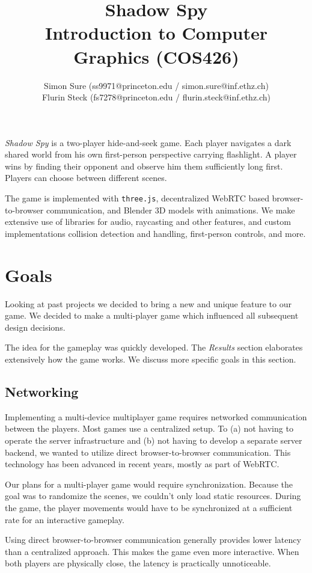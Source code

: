 \documentclass[11pt]{article}
\title{Shadow Spy\\Introduction to Computer Graphics (COS426)}
\author{Simon Sure (ss9971@princeton.edu / simon.sure@inf.ethz.ch)\\
        Flurin Steck (fs7278@princeton.edu / flurin.steck@inf.ethz.ch)}
\begin{document}
\maketitle
\textit{Shadow Spy} is a two-player hide-and-seek game. Each player navigates a dark shared world from his own first-person perspective carrying flashlight. A player wins by finding their opponent and observe him them sufficiently long first. Players can choose between different scenes.
\par The game is implemented with \texttt{three.js}, decentralized WebRTC based browser-to-browser communication, and Blender 3D models with animations. We make extensive use of libraries for audio, raycasting and other features, and custom implementations collision detection and handling, first-person controls, and more.

\tableofcontents





\section{Goals}
\par Looking at past projects we decided to bring a new and unique feature to our game. We decided to make a multi-player game which influenced all subsequent design decisions.
\par The idea for the gameplay was quickly developed. The \textit{Results} section elaborates extensively how the game works. We discuss more specific goals in this section.

\subsection{Networking}
\par Implementing a multi-device multiplayer game requires networked communication between the players. Most games use a centralized setup. To (a) not having to operate the server infrastructure and (b) not having to develop a separate server backend, we wanted to utilize direct browser-to-browser communication. This technology has been advanced in recent years, mostly as part of WebRTC.
\par Our plans for a multi-player game would require synchronization. Because the goal was to randomize the scenes, we couldn't only load static resources. During the game, the player movements would have to be synchronized at a sufficient rate for an interactive gameplay.
\par Using direct browser-to-browser communication generally provides lower latency than a centralized approach. This makes the game even more interactive. When both players are physically close, the latency is practically unnoticeable.
\end{document}
